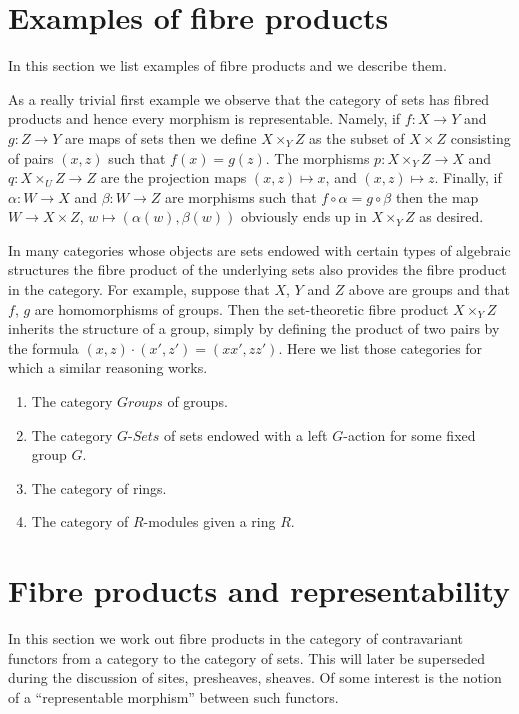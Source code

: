 \section{Examples of fibre products}
\label{section-example-fibre-products}

\noindent
In this section we list examples of fibre products and
we describe them.

\medskip\noindent
As a really trivial first example we observe
that the category of sets has fibred products and hence every
morphism is representable. Namely, if $f : X \to Y$
and $g : Z \to Y$ are maps of sets then we define
$X \times_Y Z$ as the subset of $X \times Z$ consisting
of pairs $(x, z)$ such that $f(x) = g(z)$. The morphisms
$p : X \times_Y Z \to X$ and $q : X \times_U Z \to Z$ are
the projection maps $(x, z) \mapsto x$, and $(x, z) \mapsto z$.
Finally, if $\alpha : W \to X$ and $\beta : W \to Z$
are morphisms such that $f \circ \alpha = g \circ \beta$
then the map $W \to X \times Z$, $w\mapsto (\alpha(w), \beta(w))$
obviously ends up in $X \times_Y Z$ as desired.

\medskip\noindent
In many categories whose objects are sets endowed with certain types of
algebraic structures the fibre product of the underlying sets also
provides the fibre product in the category. For example, suppose
that $X$, $Y$ and $Z$ above are groups and that $f$, $g$ are
homomorphisms of groups. Then the set-theoretic fibre product
$X \times_Y Z$ inherits the structure of a group, simply by
defining the product of two pairs by the formula
$(x, z) \cdot (x', z') = (xx', zz')$. Here we list those categories
for which a similar reasoning works.
\begin{enumerate}
\item The category $\textit{Groups}$ of groups.
\item The category $G\textit{-Sets}$ of sets
endowed with a left $G$-action for some fixed group $G$.
\item The category of rings.
\item The category of $R$-modules given a ring $R$.
\end{enumerate}




\section{Fibre products and representability}
\label{section-representable-map-presheaves}

\noindent
In this section we work out fibre products in the
category of contravariant functors from a category
to the category of sets. This will later be superseded
during the discussion of sites, presheaves, sheaves. Of some
interest is the notion of a ``representable morphism'' between
such functors.

